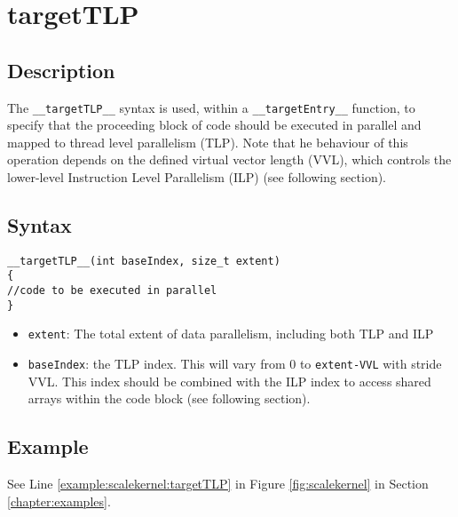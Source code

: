 



\newpage
\section{targetTLP}\label{sec:TLP}

\subsection{Description}

The \verb+__targetTLP__+ syntax is used, within a \verb+__targetEntry__+
function, to specify that the proceeding block of code should be
executed in parallel and mapped to thread level parallelism
(TLP). Note that he behaviour of this operation depends on the defined
virtual vector length (VVL), which controls the lower-level
Instruction Level Parallelism (ILP) (see following section).

\subsection{Syntax}
\begin{verbatim}
__targetTLP__(int baseIndex, size_t extent) 
{
//code to be executed in parallel
}
\end{verbatim}

\begin{itemize}
\item \verb+extent+: The total extent of data parallelism, including
  both TLP and ILP
\item \verb+baseIndex+: the TLP index. This will vary from 0 to \verb+extent-VVL+ with stride VVL. This index should be combined with the ILP index to access shared arrays within the code block (see following section).

\end{itemize}


\subsection{Example}
See Line \ref{example:scalekernel:targetTLP} in Figure \ref{fig:scalekernel} in Section \ref{chapter:examples}.

